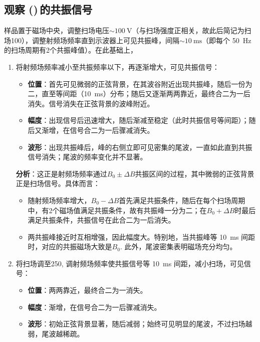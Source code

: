 \documentclass[aps,pre,12pt,preprint,%
	onecolumn,showpacs,showkeys,nofootinbib]{revtex4-1}
\newcommand{\sFeCl}[1]{\tup{FeCl\textsubscript{#1}}}
\newcommand{\sHIIO}{\tup{H\textsubscript{2}O}}
\newcommand{\specWaterPlus}{\,\sHIIO\,(\sFeCl3)\,}
\begin{document}
\subsection{观察\specWaterPlus 的共振信号}
	样品置于磁场中央，调整扫场电压$\sim\SI{100}{\V}$（与扫场强度正相关，故此后简记为扫场100），调整射频场频率直到示波器上可见共振峰，间隔$\sim\SI{10}{\ms}$（即每个 \SI{50}{\Hz} 的扫场周期有2个共振峰值）。在此基础上，
	\begin{enumerate}[label=(\arabic*),labelindent=0pt]
	\item 将射频场频率减小至共振频率以下，再逐渐增大，可见共振信号：
		\begin{itemize}
		\item \textbf{位置}：首先可见微弱的正弦背景，在其波谷附近出现共振峰，随后一份为二，直至等间距（\SI{10}{\ms}）分布；随后又逐渐两两靠近，最终合二为一后消失。信号消失在正弦背景的波峰附近。
		\item \textbf{幅度}：出现信号后迅速增大，随后渐减至稳定（此时共振信号等间距）；随后又渐增，在信号合二为一后骤减消失。
		\item \textbf{波形}：出现共振峰后，峰的右侧立即可见密集的尾波，一直如此直到共振信号消失；尾波的频率变化并不显著。
		\end{itemize}
	\vspace{2ex}\hspace{2em}\textbf{分析}：这正是射频场频率通过$B_0\pm\Delta B$共振区间的过程，其中微弱的正弦背景正是扫场信号。具体而言：\clearpage
		\begin{itemize}
		\item 随射频场频率增大，$B_0-\Delta B$首先满足共振条件，随后在每个扫场周期中，有2个磁场值满足共振条件，故有共振峰一分为二；在$B_0+\Delta B$时最后满足共振条件，共振信号在此合二为一后消失。
		\item 两共振峰接近时互相增强，因此幅度大。特别地，当共振峰等 \SI{10}{\ms} 间距时，对应的共振磁场大致是$B_0$. 此外，尾波密集表明磁场充分均匀。
		\end{itemize}
	\vspace{.5ex}
	\item 将扫场调至250, 调射频场频率使共振信号等 \SI{10}{\ms} 间距，减小扫场，可见信号：
		\begin{itemize}
		\item \textbf{位置}：两两靠近，最终合二为一消失。
		\item \textbf{幅度}：渐增，在信号合二为一后骤减消失。
		\item \textbf{波形}：初始正弦背景显著，随后减弱；始终可见明显的尾波，不过扫场越弱，尾波越稀疏。
		\end{itemize}

\end{enumerate}
\end{document}
